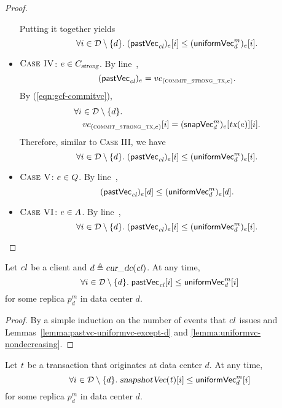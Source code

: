 \begin{proof}
\begin{itemize}
\[      \]
      Putting it together yields
      \[
        \forall i \in \mathcal{D} \setminus \{d\}.\;
          ({\sf pastVec}_{\mathit{cl}})_{e}[i] \le ({\sf uniformVec}^{m}_{d})_{e}[i].
      \]
    \item $\textsc{Case IV}$: $e \in C_{\textsl{strong}}$.
      By line~\code{\ref{alg:unistore-client}}{\ref{line:commitstrongtx-pastvc}},
      \[
        ({\sf pastVec}_{\mathit{cl}})_{e} = vc_{(\textsc{commit\_strong\_tx}, e)}.
      \]
      By (\ref{eqn:gcf-commitvc}),
      \begin{align*}
        &\forall i \in \mathcal{D} \setminus \{d\}. \\
          &\quad vc_{(\textsc{commit\_strong\_tx}, e)}[i] = ({\sf snapVec}^{m}_{d})_{e}[\textsl{tx}(e)][i].
      \end{align*}
      Therefore, similar to \textsc{Case III}, we have
      \[
        \forall i \in \mathcal{D} \setminus \{d\}.\;
          ({\sf pastVec}_{\mathit{cl}})_{e}[i] \le ({\sf uniformVec}^{m}_{d})_{e}[i].
      \]
    \item $\textsc{Case V}$: $e \in Q$.
      By line~\code{\ref{alg:unistore-replica}}{\ref{line:uniformbarrier-wait-uniformvc-d}},
      \[
        ({\sf pastVec}_{\mathit{cl}})_{e}[d] \le ({\sf uniformVec}^{m}_{d})_{e}[d].
      \]
    \item $\textsc{Case VI}$: $e \in A$.
      By line~\code{\ref{alg:unistore-replica}}{\ref{line:attach-wait-condition}},
      \[
        \forall i \in \mathcal{D} \setminus \{d\}.\;
          ({\sf pastVec}_{\mathit{cl}})_{e}[i] \le ({\sf uniformVec}^{m}_{d})_{e}[i].
      \]
  \end{itemize}
\end{proof}

\begin{applemma} \label{lemma:pastvc-uniformvc}
  Let $\mathit{cl}$ be a client and $d \triangleq \textsl{cur\_dc}(\mathit{cl})$.
  At any time,
  \[
    \forall i \in \mathcal{D} \setminus \{d\}.\;
      {\sf pastVec}_{\mathit{cl}}[i] \le {\sf uniformVec}^{m}_{d}[i]
  \]
  for some replica $p^{m}_{d}$ in data center $d$.
\end{applemma}

\begin{proof} \label{proof:pastvc-uniformvc}
  By a simple induction on the number of events that $\mathit{cl}$ issues
  and Lemmas~\ref{lemma:pastvc-uniformvc-except-d} and
  \ref{lemma:uniformvc-nondecreasing}.
\end{proof}

\begin{applemma} \label{lemma:snapshotvc-uniformvc}
  Let $\mathit{t}$ be a transaction that originates at data center $d$.
  At any time,
  \[
    \forall i \in \mathcal{D} \setminus \{d\}.\;
      \textsl{snapshotVec}(\mathit{t})[i] \le {\sf uniformVec}^{m}_{d}[i]
  \]
  for some replica $p^{m}_{d}$ in data center $d$.
\end{applemma}

